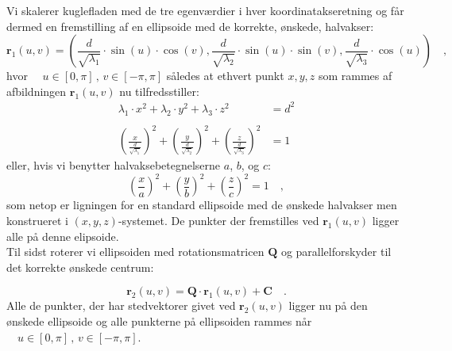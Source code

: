 Vi skalerer kuglefladen med de tre egenværdier i hver koordinatakseretning og får dermed en fremstilling af en ellipsoide med de korrekte, ønskede, halvakser:
\begin{equation}
{\mathbf{r}_{1}}(u,v) = (\frac{d}{\sqrt{\lambda_{1}}}\cdot \sin(u)\cdot \cos(v), \frac{d}{\sqrt{\lambda_{2}}}\cdot \sin(u)\cdot \sin(v),  \frac{d}{\sqrt{\lambda_{3}}}\cdot \cos(u) )    \quad ,
\end{equation}
hvor $\quad  u \in [0, \pi] \, , \,  v\in [-\pi, \pi]$
således at ethvert punkt $x, y,z$ som rammes af afbildningen  ${\mathbf{r}}_{1}(u,v)$ nu tilfredsstiller:
\begin{equation}
\begin{aligned}
\lambda_{1}\cdot {x}^{2} + \lambda_{2}\cdot {y}^{2} + \lambda_{3}\cdot {z}^{2} &= d^{2} \\ \\
\left(\frac{{x}}{\frac{d}{\sqrt{\lambda_{1}}}}\right)^{2} + \left(\frac{{y}}{\frac{d}{\sqrt{\lambda_{2}}}}\right)^{2} + \left(\frac{{z}}{\frac{d}{\sqrt{\lambda_{3}}}}\right)^{2}  &= 1
\end{aligned}
\end{equation}
eller, hvis vi benytter halvaksebetegnelserne $a$, $b$, og $c$:
\begin{equation}
\left(\frac{{x}}{a}\right)^{2} + \left(\frac{{y}}{b}\right)^{2} + \left(\frac{{z}}{c}\right)^{2}  = 1 \quad ,
\end{equation}
som netop er ligningen for en standard ellipsoide med de ønskede halvakser men konstrueret i $(x,y,z)$-systemet. De punkter der fremstilles ved ${\mathbf{r}_{1}}(u,v)$ ligger alle på denne elipsoide.\\

Til sidst roterer vi ellipsoiden med rotationsmatricen $\mathbf{Q}$ og parallelforskyder til det korrekte ønskede centrum:

\begin{equation} \label{eqPamEllipGen}
{\mathbf{r}}_{2}(u,v) = \mathbf{Q}\cdot \mathbf{{r}}_{1}(u,v) + \mathbf{C} \quad.
\end{equation}
Alle de punkter, der har stedvektorer givet ved ${\mathbf{r}}_{2}(u,v)$ ligger nu på den ønskede ellipsoide og alle punkterne på ellipsoiden rammes når
$\quad  u \in [0, \pi] \, , \,  v\in [-\pi, \pi]$.

